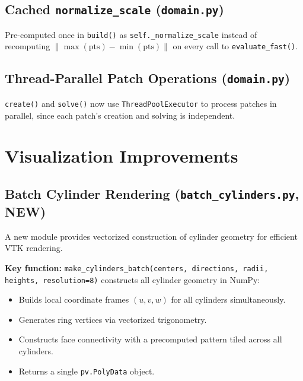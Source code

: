 \documentclass[11pt,a4paper]{article}
\begin{document}
\subsection{Cached \texttt{normalize\_scale} (\texttt{domain.py})}

Pre-computed once in \texttt{build()} as \texttt{self.\_normalize\_scale} instead of recomputing $\|\max(\text{pts}) - \min(\text{pts})\|$ on every call to \texttt{evaluate\_fast()}.

\subsection{Thread-Parallel Patch Operations (\texttt{domain.py})}

\texttt{create()} and \texttt{solve()} now use \texttt{ThreadPoolExecutor} to process patches in parallel, since each patch's creation and solving is independent.

\section{Visualization Improvements}

\subsection{Batch Cylinder Rendering (\texttt{batch\_cylinders.py}, NEW)}

A new module provides vectorized construction of cylinder geometry for efficient VTK rendering.

\textbf{Key function:} \texttt{make\_cylinders\_batch(centers, directions, radii, heights, resolution=8)} constructs all cylinder geometry in NumPy:
\begin{itemize}[nosep]
    \item Builds local coordinate frames $(u, v, w)$ for all cylinders simultaneously.
    \item Generates ring vertices via vectorized trigonometry.
    \item Constructs face connectivity with a precomputed pattern tiled across all cylinders.
    \item Returns a single \texttt{pv.PolyData} object.
\end{itemize}
\end{document}
